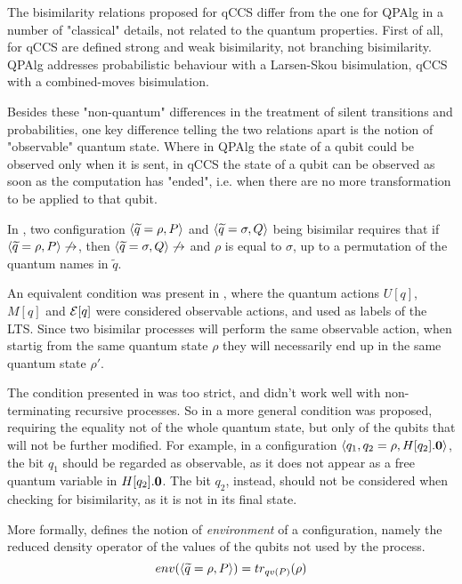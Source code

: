 The bisimilarity relations proposed for qCCS differ from the one for QPAlg in a number of "classical" details, not related to the quantum properties. First of all, for qCCS are defined strong and weak bisimilarity, not branching bisimilarity. QPAlg addresses probabilistic behaviour with a Larsen-Skou bisimulation, qCCS with a combined-moves bisimulation.

Besides these "non-quantum" differences in the treatment of silent transitions and probabilities, one key difference telling the two relations apart is the notion of "observable" quantum state. Where in QPAlg the state of a qubit could be observed only when it is sent, in qCCS the state of a qubit can be observed as soon as the computation has "ended", i.e. when there are no more transformation to be applied to that qubit.

In  \cite{fengProbabilisticBisimulationsQuantum2007}, two configuration $\langle\widetilde{q} = \rho, P\rangle$ and $\langle\widetilde{q} = \sigma, Q\rangle$ being bisimilar requires that if $\langle\widetilde{q} = \rho, P\rangle \not\rightarrow$, then $\langle\widetilde{q} = \sigma, Q\rangle \not\rightarrow$ and $\rho$ is equal to $\sigma$, up to a permutation of the quantum names in $\widetilde{q}$. 

An equivalent condition was present in \cite{yingAlgebraQuantumProcesses2010}, where the quantum actions $U[q]$, $M[q]$ and $\mathcal{E}[q]$ were considered observable actions, and used as labels of the LTS. Since two bisimilar processes will perform the same observable action, when startig from the same quantum state $\rho$ they will necessarily end up in the same quantum state $\rho'$.

The condition presented in \cite{fengProbabilisticBisimulationsQuantum2007} was too strict, and didn't work well with non-terminating recursive processes. So in \cite{fengBisimulationQuantumProcesses2012} a more general condition was proposed, requiring the equality not of the whole quantum state, but only of the qubits that will not be further modified. For example, in a configuration $\langle q_1, q_2 = \rho, H[q_2].\mathbf{0}\rangle$, the bit $q_1$ should be regarded as observable, as it does not appear as a free quantum variable in $H[q_2].\mathbf{0}$. The bit $q_2$, instead, should not be considered when checking for bisimilarity, as it is not in its final state.

More formally, \cite{fengBisimulationQuantumProcesses2012} defines the notion of \textit{environment} of a configuration, namely the reduced density operator of the values of the qubits not used by the process.
\[env(\langle\widetilde{q} = \rho, P\rangle) = tr_{qv(P)}(\rho)\]


